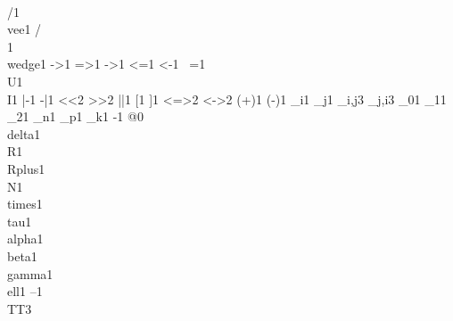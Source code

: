 {{        {\\/}{{}}1
        {\\vee}{{}}1
        {/\\}{{}}1
        {\\wedge}{{}}1
        {->}{{}}1
        {=>}{{}}1
        {->}{{}}1
        {<=}{{}}1
        {<-}{{}}1
{~=}{{}}1
        {\\U}{{}}1
        {\\I}{{}}1
        {|-}{{}}1
        {-|}{{}}1
        {<<}{{}}2
        {>>}{{}}2
        {||}{{}}1
{[}{{}}1
        {]}{{}}1
{<=>}{{}}2
        {<->}{{}}2
        {(+)}{{}}1
        {(-)}{{}}1
        {_i}{{}}1
        {_j}{{}}1
        {_{i,j}}{{}}3
        {_{j,i}}{{}}3
        {_0}{{}}1
        {_1}{{}}1
        {_2}{{}}1
        {_n}{{}}1
        {_p}{{}}1
        {_k}{{}}1
        {-}{{}}1
        {@}{{}}0
        {\\delta}{{}}1
        {\\R}{{}}1
        {\\Rplus}{{}}1
        {\\N}{{}}1
        {\\times}{{}}1
        {\\tau}{{}}1
        {\\alpha}{{}}1
        {\\beta}{{}}1
        {\\gamma}{{}}1
        {\\ell}{{}}1
        {--}{{}}1
        {\\TT}{{\hspace{1.5em}}}3
      }



}
